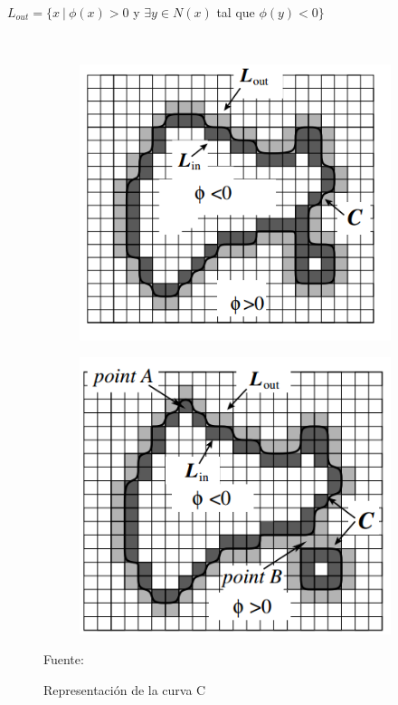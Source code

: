 \

$L_{out} = \{x \ | \ \phi(x) > 0$ y $  \exists y \in N(x)$ tal que $\phi(y) < 0\}$

\

\begin{figure}[H]
	\captionsetup{justification=centering}	
	\begin{center}
		\begin{subfigure}[t]{2.5in}
			\centering
			\includegraphics[width=1\textwidth]{./imagenes/aproxLevelSet1}
			\subcaption{}\label{aproxLevelSet1}
		\end{subfigure}
		\begin{subfigure}[t]{2.5in}
			\centering
			\includegraphics[width=1\textwidth]{./imagenes/aproxLevelSet2}	
			\subcaption{}\label{aproxLevelSet2}
		\end{subfigure}
	\end{center}
	\caption{Representaci\'{o}n de la curva C}
	\vspace{2 mm}		
	\centering
	Fuente: \cite{yong1}	
	\label{aproxLevelSet}
\end{figure}	

